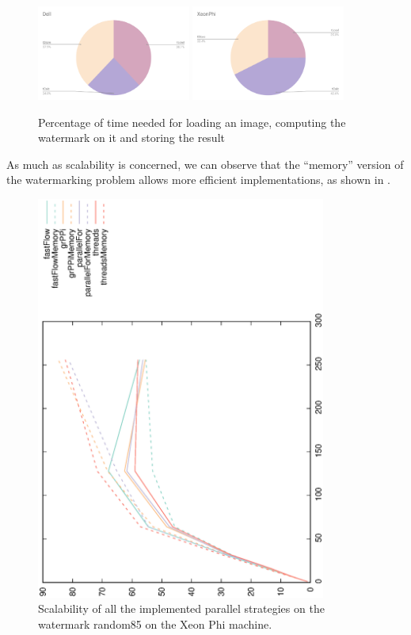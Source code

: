 \documentclass[12pt,a4paper,english]{article}
\begin{document}
\begin{figure}[h]
  \includegraphics[width=0.45\textwidth]{Dell.pdf}
  \includegraphics[width=0.45\textwidth]{XeonPhi.pdf}
  \caption{Percentage of time needed for loading an image, computing the watermark on it and storing the result}\label{fig:charts}
\end{figure}


As much as scalability is concerned, we can observe that the ``memory'' version of the watermarking problem allows more efficient implementations, as shown in . 

\begin{figure}[h]
  \centering
  \includegraphics[angle=270, width=0.85\textwidth]{scalability.eps}
  \vspace{1cm}
  \caption{Scalability of all the implemented parallel strategies on the watermark random85 on the Xeon Phi machine.}\label{fig:scalability}
\end{figure}
\end{document}
